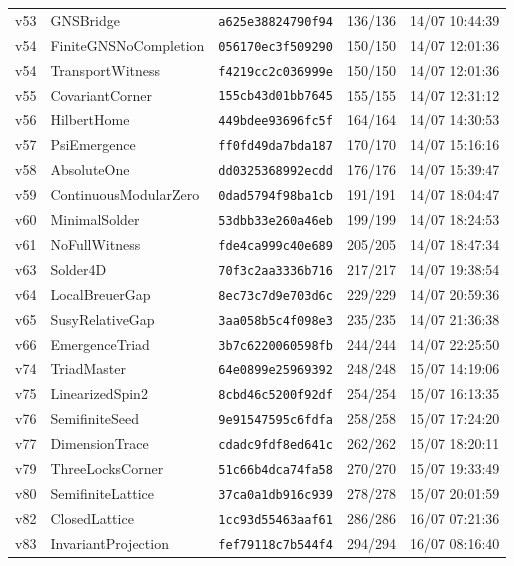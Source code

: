 \documentclass[11pt]{article}
\theoremstyle{definition}\newtheorem{deriv}{Derivation}
\begin{document}
{\begin{longtable}{@{}lllll@{}}
v53 & GNSBridge & \texttt{a625e38824790f94} & 136/136 & 14/07 10:44:39 \\
v54 & FiniteGNSNoCompletion & \texttt{056170ec3f509290} & 150/150 & 14/07 12:01:36 \\
v54 & TransportWitness & \texttt{f4219cc2c036999e} & 150/150 & 14/07 12:01:36 \\
v55 & CovariantCorner & \texttt{155cb43d01bb7645} & 155/155 & 14/07 12:31:12 \\
v56 & HilbertHome & \texttt{449bdee93696fc5f} & 164/164 & 14/07 14:30:53 \\
v57 & PsiEmergence & \texttt{ff0fd49da7bda187} & 170/170 & 14/07 15:16:16 \\
v58 & AbsoluteOne & \texttt{dd0325368992ecdd} & 176/176 & 14/07 15:39:47 \\
v59 & ContinuousModularZero & \texttt{0dad5794f98ba1cb} & 191/191 & 14/07 18:04:47 \\
v60 & MinimalSolder & \texttt{53dbb33e260a46eb} & 199/199 & 14/07 18:24:53 \\
v61 & NoFullWitness & \texttt{fde4ca999c40e689} & 205/205 & 14/07 18:47:34 \\
v63 & Solder4D & \texttt{70f3c2aa3336b716} & 217/217 & 14/07 19:38:54 \\
v64 & LocalBreuerGap & \texttt{8ec73c7d9e703d6c} & 229/229 & 14/07 20:59:36 \\
v65 & SusyRelativeGap & \texttt{3aa058b5c4f098e3} & 235/235 & 14/07 21:36:38 \\
v66 & EmergenceTriad & \texttt{3b7c6220060598fb} & 244/244 & 14/07 22:25:50 \\
v74 & TriadMaster & \texttt{64e0899e25969392} & 248/248 & 15/07 14:19:06 \\
v75 & LinearizedSpin2 & \texttt{8cbd46c5200f92df} & 254/254 & 15/07 16:13:35 \\
v76 & SemifiniteSeed & \texttt{9e91547595c6fdfa} & 258/258 & 15/07 17:24:20 \\
v77 & DimensionTrace & \texttt{cdadc9fdf8ed641c} & 262/262 & 15/07 18:20:11 \\
v79 & ThreeLocksCorner & \texttt{51c66b4dca74fa58} & 270/270 & 15/07 19:33:49 \\
v80 & SemifiniteLattice & \texttt{37ca0a1db916c939} & 278/278 & 15/07 20:01:59 \\
v82 & ClosedLattice & \texttt{1cc93d55463aaf61} & 286/286 & 16/07 07:21:36 \\
v83 & InvariantProjection & \texttt{fef79118c7b544f4} & 294/294 & 16/07 08:16:40 \\

\end{longtable}}
\end{document}

